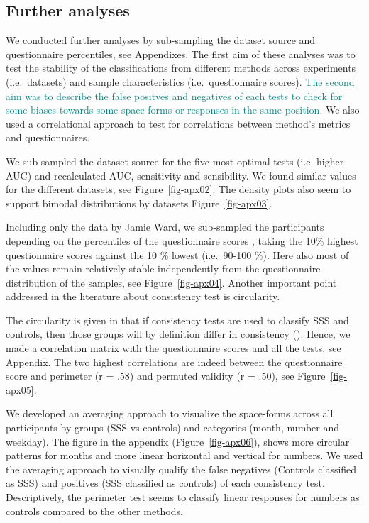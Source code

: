 \documentclass[
  man,
  floatsintext,
  longtable,
  a4paper,
  nolmodern,
  notxfonts,
  notimes,
  colorlinks=true,linkcolor=blue,citecolor=blue,urlcolor=blue]{apa7}
\begin{document}
\subsection{Further analyses}\label{further-analyses}

We conducted further analyses by sub-sampling the dataset source and
questionnaire percentiles, see Appendixes. The first aim of these
analyses was to test the stability of the classifications from different
methods across experiments (i.e.~datasets) and sample characteristics
(i.e.~questionnaire scores).
\textcolor{teal}{The second aim was to describe the false positves and negatives of each tests to check for some biases towards some space-forms or responses in the same position}.
We also used a correlational approach to test for correlations between
method's metrics and questionnaires.

We sub-sampled the dataset source for the five most optimal tests (i.e.
higher AUC) and recalculated AUC, sensitivity and sensibility. We found
similar values for the different datasets, see Figure~\ref{fig-apx02}.
The density plots also seem to support bimodal distributions by datasets
Figure~\ref{fig-apx03}.

Including only the data by Jamie Ward, we sub-sampled the participants
depending on the percentiles of the questionnaire scores , taking the
10\% highest questionnaire scores against the 10 \% lowest (i.e.~90-100
\%). Here also most of the values remain relatively stable independently
from the questionnaire distribution of the samples, see
Figure~\ref{fig-apx04}. Another important point addressed in the
literature about consistency test is circularity.

The circularity is given in that if consistency tests are used to
classify SSS and controls, then those groups will by definition differ
in consistency (). Hence, we
made a correlation matrix with the questionnaire scores and all the
tests, see Appendix. The two highest correlations are indeed between the
questionnaire score and perimeter (r = .58) and permuted validity (r =
.50), see Figure~\ref{fig-apx05}.

We developed an
averaging approach to visualize the space-forms across all participants
by groups (SSS vs controls) and categories (month, number and weekday).
The figure in the appendix (Figure~\ref{fig-apx06}), shows more circular
patterns for months and more linear horizontal and vertical for numbers.
We used the averaging approach to visually qualify the false negatives
(Controls classified as SSS) and positives (SSS classified as controls)
of each consistency test. Descriptively, the perimeter test seems to
classify linear responses for numbers as controls compared to the other
methods.
\end{document}

